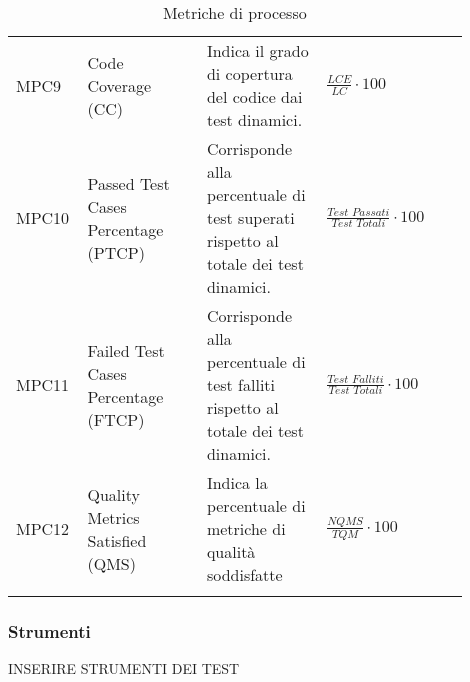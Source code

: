 \begin{longtable}{P{0.1\linewidth}P{0.25\linewidth}P{0.25\linewidth}P{0.30\linewidth}}
	    	MPC9 & Code Coverage (CC) 
            & Indica il grado di copertura del codice dai test dinamici.
            & $\frac{LCE}{LC} \cdot 100$		\\[4pt]
            MPC10 
            & Passed Test Cases Percentage (PTCP) 
            & Corrisponde alla percentuale di test superati rispetto al totale dei test dinamici.
            & $\frac{\textit{Test Passati}}{\textit{Test Totali}} \cdot 100$	\\[4pt]
	    	MPC11 
            & Failed Test Cases Percentage (FTCP) 
            & Corrisponde alla percentuale di test falliti rispetto al totale dei test dinamici.
            & $\frac{\textit{Test Falliti}}{\textit{Test Totali}} \cdot 100$ \\[4pt]
            MPC12 
            & Quality Metrics Satisfied (QMS) 
            & Indica la percentuale di metriche di qualità soddisfatte
            & $\frac{NQMS}{TQM} \cdot 100$		\\[4pt]
    \caption{Metriche di processo}
\end{longtable}
\setlength\extrarowheight{0pt}

\subsubsection{Strumenti}
 INSERIRE STRUMENTI DEI TEST